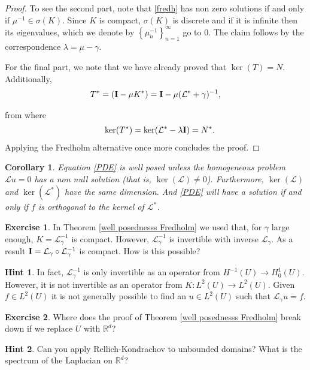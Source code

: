 \documentclass[
    a4paper,
    DIV=14,
    abstract=true,
    numbers=noenddot
]
{scrartcl}
\newtheorem{corollary}[theorem]{Corollary}
\theoremstyle{definition}
\newtheorem{exercise}{Exercise}
\newtheorem*{hint}{Hint}
\newcommand{\R}{\mathbb{R}}
\newcommand{\Ll}{\mathcal{L}}
\begin{document}
\begin{proof}
    To see the second part, note that \eqref{fredh} has non zero solutions if and only if $\mu ^{-1} \in \sigma (K)$. Since $K$ is compact, $\sigma(K)$ is discrete and if it is infinite then its eigenvalues, which we denote by $\left\{\mu _n^{-1}\right\}_{n=1}^\infty$ go to $0$. The claim follows by the correspondence $\lambda =\mu -\gamma$.

    For the final part, we note that we have already proved that $\ker(T)=N$. Additionally,
    \begin{align*}
        T^* =(\vb{I}-\mu K^*) =\vb{I}-\mu (\Ll^*+ \gamma  )^{-1},
    \end{align*}

    from where
    \begin{align*}
        \quad \ker(T^*)=\ker(\Ll^* -\lambda \vb{I})= N^*.
    \end{align*}
    Applying the Fredholm alternative once more concludes the proof.
\end{proof}

\begin{corollary}
    Equation \eqref{PDE} is well posed unless the homogeneous problem $\Ll u=0$ has a non null solution (that is, $\ker(\Ll )\neq 0$). Furthermore,  $\ker(\Ll) $ and $\ker(\Ll ^*)$ have the same dimension.  And \eqref{PDE} will have a solution if and only if $f$ is orthogonal to the kernel of $\Ll^*$.
\end{corollary}


\begin{exercise}
    In Theorem \ref{well posednesss Fredholm} we used that, for $\gamma $ large enough,  $K= \Ll_{\gamma }^{-1} $ is compact. However, $\Ll_{\gamma }^{-1}$ is invertible with inverse $\Ll _\gamma $. As a result $\vb{I}=\Ll _\gamma \circ \Ll _\gamma ^{-1}$  is compact. How is this possible?
\end{exercise}
\begin{hint}
    In fact, $\Ll_\gamma^{-1} $ is only invertible as an operator from $H^{-1}(U) \to H^1_0(U)$. However, it is not invertible as an operator from $K:L^2(U) \to L^2(U)$. Given $f \in L^2(U)$ it is not generally possible to find an $u \in L^2(U)$ such that $\Ll_\gamma u =f$.
\end{hint}
\begin{exercise}
    Where does the proof of Theorem \ref{well posednesss Fredholm} break down if we replace $U$ with $\R^d$?
\end{exercise}
\begin{hint}
    Can you apply Rellich-Kondrachov to unbounded domains? What is the spectrum of the Laplacian on $\R^d$?
\end{hint}
\end{document}
